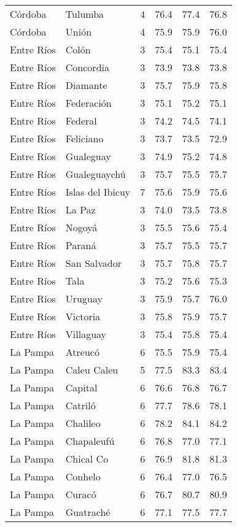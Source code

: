 \documentclass[12pt,spanish,]{article}
\begin{document}
\begin{landscape}
\begin{longtable}[t]{llrrrr}
Córdoba & Tulumba & 4 & 76.4 & 77.4 & 76.8\\
Córdoba & Unión & 4 & 75.9 & 75.9 & 76.0\\
Entre Ríos & Colón & 3 & 75.4 & 75.1 & 75.4\\
\addlinespace
Entre Ríos & Concordia & 3 & 73.9 & 73.8 & 73.8\\
Entre Ríos & Diamante & 3 & 75.7 & 75.9 & 75.8\\
Entre Ríos & Federación & 3 & 75.1 & 75.2 & 75.1\\
Entre Ríos & Federal & 3 & 74.2 & 74.5 & 74.1\\
Entre Ríos & Feliciano & 3 & 73.7 & 73.5 & 72.9\\
\addlinespace
Entre Ríos & Gualeguay & 3 & 74.9 & 75.2 & 74.8\\
Entre Ríos & Gualeguaychú & 3 & 75.7 & 75.5 & 75.7\\
Entre Ríos & Islas del Ibicuy & 7 & 75.6 & 75.9 & 75.6\\
Entre Ríos & La Paz & 3 & 74.0 & 73.5 & 73.8\\
Entre Ríos & Nogoyá & 3 & 75.5 & 75.6 & 75.4\\
\addlinespace
Entre Ríos & Paraná & 3 & 75.7 & 75.5 & 75.7\\
Entre Ríos & San Salvador & 3 & 75.7 & 75.8 & 75.7\\
Entre Ríos & Tala & 3 & 75.2 & 75.6 & 75.3\\
Entre Ríos & Uruguay & 3 & 75.9 & 75.7 & 76.0\\
Entre Ríos & Victoria & 3 & 75.8 & 75.9 & 75.7\\
\addlinespace
Entre Ríos & Villaguay & 3 & 75.4 & 75.8 & 75.4\\
La Pampa & Atreucó & 6 & 75.5 & 75.9 & 75.4\\
La Pampa & Caleu Caleu & 5 & 77.5 & 83.3 & 83.4\\
La Pampa & Capital & 6 & 76.6 & 76.8 & 76.7\\
La Pampa & Catriló & 6 & 77.7 & 78.6 & 78.1\\
\addlinespace
La Pampa & Chalileo & 6 & 78.2 & 84.1 & 84.2\\
La Pampa & Chapaleufú & 6 & 76.8 & 77.0 & 77.1\\
La Pampa & Chical Co & 6 & 76.9 & 81.8 & 81.3\\
La Pampa & Conhelo & 6 & 76.4 & 77.0 & 76.5\\
La Pampa & Curacó & 6 & 76.7 & 80.7 & 80.9\\
\addlinespace
La Pampa & Guatraché & 6 & 77.1 & 77.5 & 77.7\\

\end{longtable}
\end{landscape}
\end{document}
